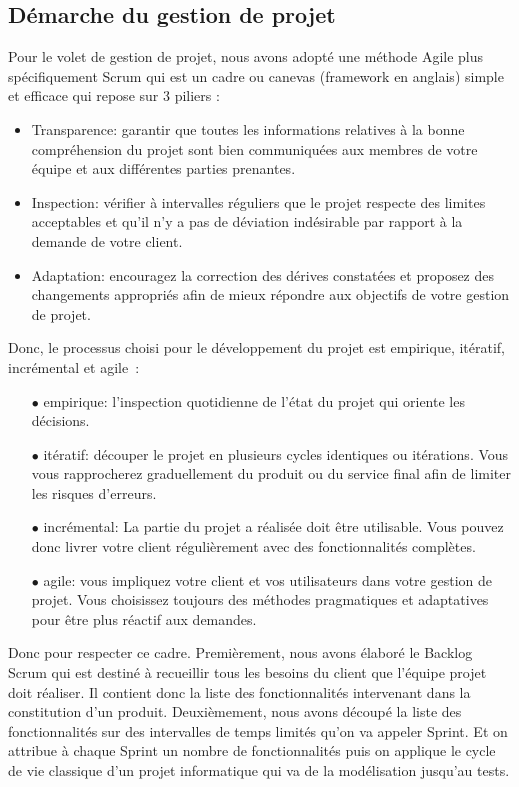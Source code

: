 \subsection{Démarche du gestion de projet} %
\label{sub:démarche_du_gestion_de_projet}
Pour le volet de gestion de projet, nous avons adopté une méthode Agile plus spécifiquement Scrum qui est un cadre ou canevas (framework en anglais) simple et efficace qui repose sur 3 piliers :
\begin{itemize}
	\item Transparence: garantir que toutes les informations relatives à la bonne compréhension du projet sont bien communiquées aux membres de votre équipe et aux différentes parties prenantes.
	\item Inspection: vérifier à intervalles réguliers que le projet respecte des limites acceptables et qu’il n’y a pas de déviation indésirable par rapport à la demande de votre client.
	\item Adaptation: encouragez la correction des dérives constatées et proposez des changements appropriés afin de mieux répondre aux objectifs de votre gestion de projet.
\end{itemize}
Donc, le processus choisi pour le développement du projet est empirique, itératif, incrémental et agile : 
\begin{itemize}
	\item[$\bullet$] empirique: l'inspection quotidienne de l'état du projet qui oriente les décisions.
	\item[$\bullet$] itératif: découper le projet en plusieurs cycles identiques ou itérations. Vous vous rapprocherez graduellement du produit ou du service final afin de limiter les risques d'erreurs.
	\item[$\bullet$] incrémental: La partie du projet a réalisée doit être utilisable. Vous pouvez donc livrer votre client régulièrement avec des fonctionnalités complètes.
	\item[$\bullet$] agile: vous impliquez votre client et vos utilisateurs dans votre gestion de projet. Vous choisissez toujours des méthodes pragmatiques et adaptatives pour être plus réactif aux demandes.
\end{itemize}
Donc pour respecter ce cadre. Premièrement, nous avons élaboré le Backlog Scrum qui est destiné à recueillir tous les besoins du client que l'équipe projet doit réaliser. Il contient donc la liste des fonctionnalités intervenant dans la constitution d'un produit.
Deuxièmement, nous avons découpé la liste des fonctionnalités sur des intervalles de temps limités qu'on va appeler Sprint. Et on attribue à chaque Sprint un nombre de fonctionnalités puis on applique le cycle de vie classique d'un projet informatique qui va de la modélisation jusqu'au tests.\newline
{}

